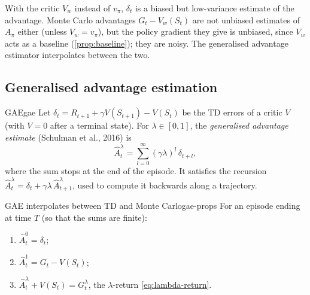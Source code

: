 With the critic $V_w$ instead of $v_\pi$, $\delta_t$ is a biased but
low-variance estimate of the advantage. Monte Carlo advantages $G_t -
V_w(S_t)$ are not unbiased estimates of $A_\pi$ either (unless $V_w =
v_\pi$), but the policy gradient they give is unbiased, since $V_w$ acts as
a baseline (\cref{prop:baseline}); they are noisy. The generalised
advantage estimator interpolates between the two.

\subsection{Generalised advantage estimation}

\begin{definition}{GAE}{gae}
  Let $\delta_t = R_{t+1} + \gamma V(S_{t+1}) - V(S_t)$ be the TD errors of
  a critic $V$ (with $V = 0$ after a terminal state). For $\lambda \in [0,
  1]$, the \emph{generalised advantage estimate} (Schulman et al., 2016) is
  \begin{equation}
    \label{eq:gae}
    \hat A_t^{\lambda} = \sum_{l=0}^{\infty} (\gamma \lambda)^l\,
    \delta_{t+l},
  \end{equation}
  where the sum stops at the end of the episode. It satisfies the recursion
  $\hat A_t^\lambda = \delta_t + \gamma \lambda\, \hat A_{t+1}^\lambda$, used
  to compute it backwards along a trajectory.
\end{definition}

\begin{proposition}{GAE interpolates between TD and Monte Carlo}{gae-props}
  For an episode ending at time $T$ (so that the sums are finite):
  \begin{enumerate}[nosep, label=(\roman*)]
    \item $\hat A_t^0 = \delta_t$;
    \item $\hat A_t^1 = G_t - V(S_t)$;
    \item $\hat A_t^\lambda + V(S_t) = G_t^\lambda$, the $\lambda$-return
      \eqref{eq:lambda-return}.
  \end{enumerate}
\end{proposition}

